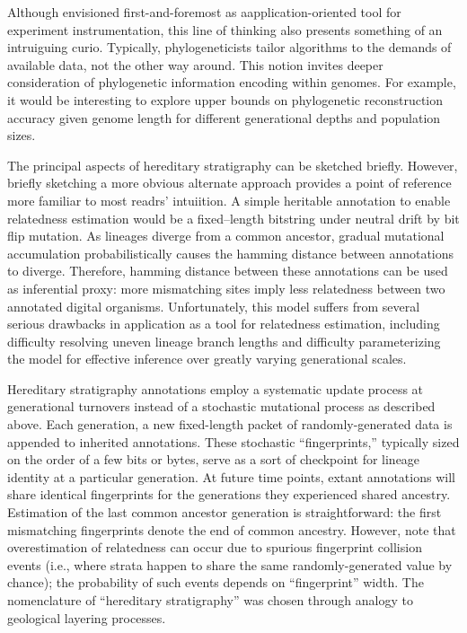 Although envisioned first-and-foremost as aapplication-oriented tool for experiment instrumentation, this line of thinking also presents something of an intruiguing curio.
Typically, phylogeneticists tailor algorithms to the demands of available data, not the other way around.
This notion invites deeper consideration of phylogenetic information encoding within genomes.
For example, it would be interesting to explore upper bounds on phylogenetic reconstruction accuracy given genome length for different generational depths and population sizes.

The principal aspects of hereditary stratigraphy can be sketched briefly.
However, briefly sketching a more obvious alternate approach provides a point of reference more familiar to most readrs' intuiition.
A simple heritable annotation to enable relatedness estimation would be a fixed--length bitstring under neutral drift by bit flip mutation.
As lineages diverge from a common ancestor, gradual mutational accumulation probabilistically causes the hamming distance between annotations to diverge.
Therefore, hamming distance between these annotations can be used as inferential proxy: more mismatching sites imply less relatedness between two annotated digital organisms.
Unfortunately, this model suffers from several serious drawbacks in application as a tool for relatedness estimation, including difficulty resolving uneven lineage branch lengths and difficulty parameterizing the model for effective inference over greatly varying generational scales.

Hereditary stratigraphy annotations employ a systematic update process at generational turnovers instead of a stochastic mutational process as described above.
Each generation, a new fixed-length packet of randomly-generated data is appended to inherited annotations.
These stochastic ``fingerprints,'' typically sized on the order of a few bits or bytes, serve as a sort of checkpoint for lineage identity at a particular generation.
At future time points, extant annotations will share identical fingerprints for the generations they experienced shared ancestry.
Estimation of the last common ancestor generation is straightforward: the first mismatching fingerprints denote the end of common ancestry.
However, note that overestimation of relatedness can occur due to spurious fingerprint collision events (i.e., where strata happen to share the same randomly-generated value by chance); the probability of such events depends on ``fingerprint'' width.
The nomenclature of ``hereditary stratigraphy'' was chosen through analogy to geological layering processes.

